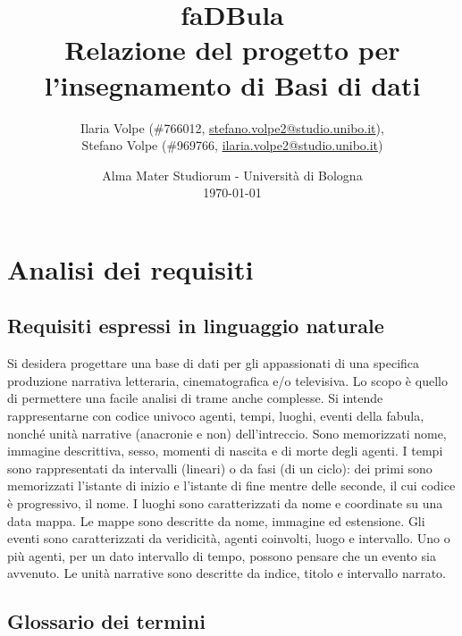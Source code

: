 \documentclass{article}
\title{
	faDBula \\
	\textbf{\large
		Relazione del progetto per l'insegnamento di \break
		Basi di dati
	}
}
\author{
	Ilaria Volpe (\#766012,
	\href{mailto:stefano.volpe2@studio.unibo.it}{stefano.volpe2@studio.unibo.it}),
	\\
	Stefano Volpe (\#969766,
	\href{mailto:ilaria.volpe2@studio.unibo.it}{ilaria.volpe2@studio.unibo.it})
}
\date{
	Alma Mater Studiorum - Universit\`a di Bologna \\
	\today
}
\begin{document}
\maketitle
\thispagestyle{empty}
\tableofcontents

\section{Analisi dei requisiti}

\subsection{Requisiti espressi in linguaggio naturale}

Si desidera progettare una base di dati per gli appassionati di una specifica
produzione narrativa letteraria, cinematografica e/o televisiva. Lo scopo è
quello di permettere una facile analisi di trame anche complesse. Si intende
rappresentarne con codice univoco agenti, tempi, luoghi, eventi della fabula,
nonché unità narrative (anacronie e non) dell'intreccio. Sono memorizzati nome,
immagine descrittiva, sesso, momenti di nascita e di morte degli agenti. I
tempi sono rappresentati da intervalli (lineari) o da fasi (di un ciclo): dei
primi sono memorizzati l'istante di inizio e l'istante di fine mentre delle
seconde, il cui codice è progressivo, il nome. I luoghi sono caratterizzati da
nome e coordinate su una data mappa. Le mappe sono descritte da nome, immagine
ed estensione. Gli eventi sono caratterizzati da veridicità, agenti coinvolti,
luogo e intervallo. Uno o più agenti, per un dato intervallo di tempo, possono
pensare che un evento sia avvenuto. Le unità narrative sono descritte da indice,
titolo e intervallo narrato.

\subsection{Glossario dei termini}
\end{document}
